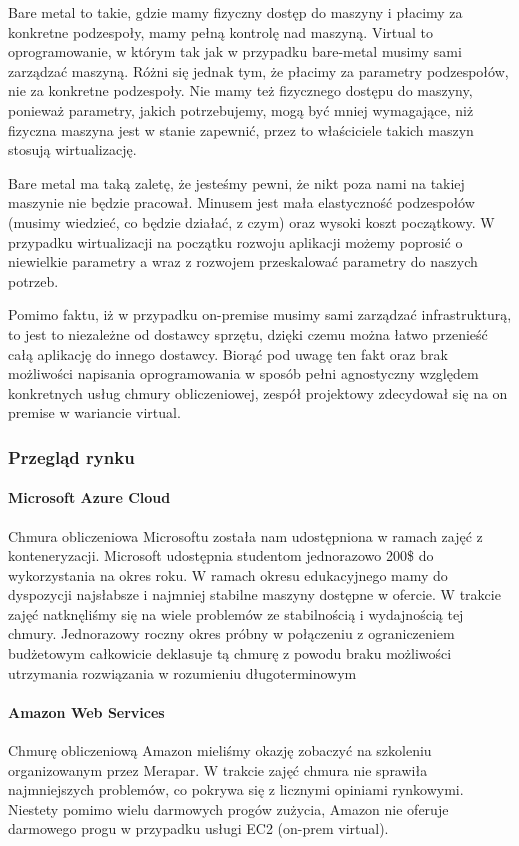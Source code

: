 Bare metal to takie, gdzie mamy fizyczny dostęp do maszyny i płacimy za konkretne podzespoły, mamy pełną kontrolę nad maszyną.
Virtual to oprogramowanie, w którym tak jak w przypadku bare-metal musimy sami zarządzać maszyną.
Różni się jednak tym, że płacimy za parametry podzespołów, nie za konkretne podzespoły.
Nie mamy też fizycznego dostępu do maszyny, ponieważ parametry, jakich potrzebujemy, mogą być mniej wymagające, niż fizyczna maszyna jest w stanie zapewnić, przez to właściciele takich maszyn stosują wirtualizację.

Bare metal ma taką zaletę, że jesteśmy pewni, że nikt poza nami na takiej maszynie nie będzie pracował.
Minusem jest mała elastyczność podzespołów (musimy wiedzieć, co będzie działać, z czym) oraz wysoki koszt początkowy.
W przypadku wirtualizacji na początku rozwoju aplikacji możemy poprosić o niewielkie parametry a wraz z rozwojem przeskalować parametry do naszych potrzeb.

Pomimo faktu, iż w przypadku on-premise musimy sami zarządzać infrastrukturą, to jest to niezależne od dostawcy sprzętu, dzięki czemu można łatwo przenieść całą aplikację do innego dostawcy.
Biorąć pod uwagę ten fakt oraz brak możliwości napisania oprogramowania w sposób pełni agnostyczny względem konkretnych usług chmury obliczeniowej, zespół projektowy zdecydował się na on premise w wariancie virtual.

\subsubsection{Przegląd rynku}
\paragraph{Microsoft Azure Cloud}
Chmura obliczeniowa Microsoftu została nam udostępniona w ramach zajęć z konteneryzacji.
Microsoft udostępnia studentom jednorazowo 200\$ do wykorzystania na okres roku.
W ramach okresu edukacyjnego mamy do dyspozycji najsłabsze i najmniej stabilne maszyny dostępne w ofercie.
W trakcie zajęć natknęliśmy się na wiele problemów ze stabilnością i wydajnością tej chmury.
Jednorazowy roczny okres próbny w połączeniu z ograniczeniem budżetowym całkowicie deklasuje tą chmurę z powodu braku możliwości utrzymania rozwiązania w rozumieniu długoterminowym

\paragraph{Amazon Web Services}
Chmurę obliczeniową Amazon mieliśmy okazję zobaczyć na szkoleniu organizowanym przez Merapar.
W trakcie zajęć chmura nie sprawiła najmniejszych problemów, co pokrywa się z licznymi opiniami rynkowymi.
Niestety pomimo wielu darmowych progów zużycia, Amazon nie oferuje darmowego progu w przypadku usługi EC2 (on-prem virtual).

